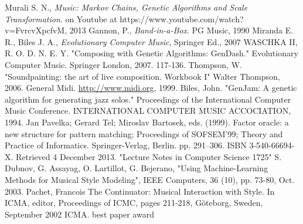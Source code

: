 \begin{thebibliography}{50}
   Murali S. N., \textsl{Music: Markov Chains, Genetic Algorithms and Scale Transformation}.
		on Youtube at https://www.youtube.com/watch?v=FvrcvXpcfvM, 2013
   Gannon, P., \textsl{Band-in-a-Box}. PG Music, 1990
   Miranda E. R., Biles J. A., \textsl{Evolutionary Computer Music}, Springer Ed., 2007
   WASCHKA II, R. O. D. N. E. Y. "Composing with Genetic Algorithms: GenDash." Evolutionary Computer Music. Springer London, 2007. 117-136.
   Thompson, W. "Soundpainting: the art of live composition. Workbook I" Walter Thompson, 2006.
   General Midi. \url{http://www.midi.org}, 1999.
   Biles, John. "GenJam: A genetic algorithm for generating jazz solos." Proceedings of the International Computer Music Conference. INTERNATIONAL COMPUTER MUSIC ACCOCIATION, 1994.
    Jan Pavelka; Gerard Tel; Miroslav Bartosek, eds. (1999). Factor oracle: a new structure for pattern matching; Proceedings of SOFSEM’99; Theory and Practice of Informatics. Springer-Verlag, Berlin. pp. 291–306. ISBN 3-540-66694-X. Retrieved 4 December 2013. "Lecture Notes in Computer Science 1725"
   S. Dubnov, G. Assayag, O. Lartillot, G. Bejerano, "Using Machine-Learning Methods for Musical Style Modeling", IEEE Computers, 36 (10), pp. 73-80, Oct. 2003.
   Pachet, Francois The Continuator: Musical Interaction with Style. In ICMA, editor, Proceedings of ICMC, pages 211-218, Göteborg, Sweden, September 2002 ICMA. best paper award 
  \end{thebibliography}
